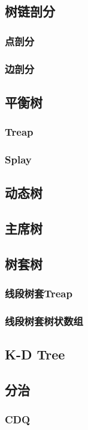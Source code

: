 \documentclass[twocolumn,a4]{article}
\newcommand{\addcpp}[1]{}
\begin{document}
	\subsection{树链剖分}
		\subsubsection{点剖分}
		\subsubsection{边剖分}
	\subsection{平衡树}
		\subsubsection{Treap}
		\subsubsection{Splay}
	\subsection{动态树}
	\subsection{主席树}
	\subsection{树套树}
		\subsubsection{线段树套Treap}
		\subsubsection{线段树套树状数组}
	\subsection{K-D Tree}
	\subsection{分治}
		\subsubsection{CDQ}
\end{document}
